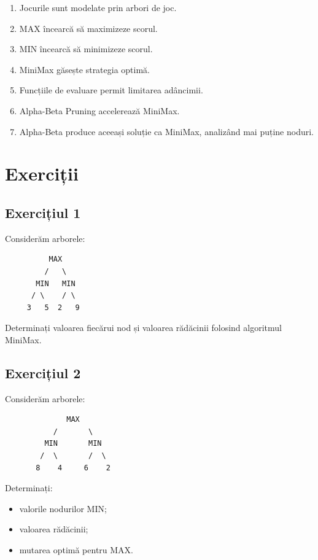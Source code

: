 \documentclass[12pt,a4paper]{article}
\begin{document}
\begin{enumerate}
\item Jocurile sunt modelate prin arbori de joc.
\item MAX încearcă să maximizeze scorul.
\item MIN încearcă să minimizeze scorul.
\item MiniMax găsește strategia optimă.
\item Funcțiile de evaluare permit limitarea adâncimii.
\item Alpha-Beta Pruning accelerează MiniMax.
\item Alpha-Beta produce aceeași soluție ca MiniMax, analizând mai puține noduri.
\end{enumerate}












\section{Exerciții}

\subsection{Exercițiul 1}

Considerăm arborele:

\begin{verbatim}
          MAX
         /   \
       MIN   MIN
      / \    / \
     3   5  2   9
\end{verbatim}

Determinați valoarea fiecărui nod și valoarea rădăcinii folosind algoritmul MiniMax.

\subsection{Exercițiul 2}

Considerăm arborele:

\begin{verbatim}
              MAX
           /       \
         MIN       MIN
        /  \       /  \
       8    4     6    2
\end{verbatim}

Determinați:

\begin{itemize}
\item valorile nodurilor MIN;
\item valoarea rădăcinii;
\item mutarea optimă pentru MAX.
\end{itemize}
\end{document}
